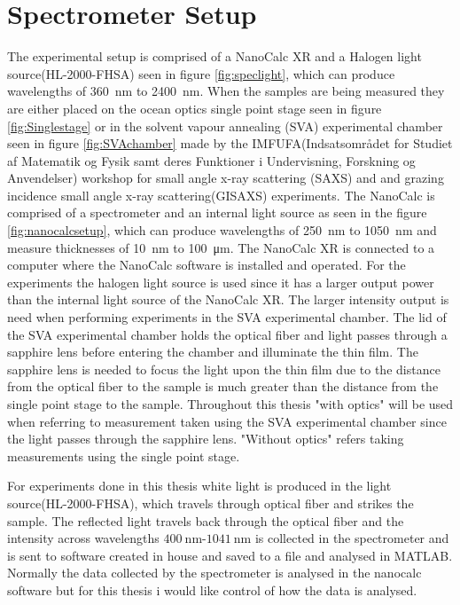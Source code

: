 \documentclass[MasterThesisMain.tex]{subfiles}
\begin{document}
\section{Spectrometer Setup}
The experimental setup is comprised of a NanoCalc XR and a Halogen light source(HL-2000-FHSA) seen in figure \ref{fig:speclight}, which can produce wavelengths of \SI{360}{\nano\meter} to \SI{2400}{\nano\meter}. When the samples are being measured they are either placed on the ocean optics single point stage seen in figure \ref{fig:Singlestage} or in the solvent vapour annealing (SVA) experimental chamber seen in figure \ref{fig:SVAchamber} made by the IMFUFA(Indsatsområdet for Studiet af Matematik og Fysik samt deres Funktioner i Undervisning, Forskning og Anvendelser) workshop for small angle x-ray scattering (SAXS) and and grazing incidence small angle x-ray scattering(GISAXS) experiments. The NanoCalc is comprised of a spectrometer and an internal light source as seen in the figure \ref{fig:nanocalcsetup}, which can produce wavelengths of \SI{250}{\nano\meter} to \SI{1050}{\nano\meter} and measure thicknesses of \SI{10}{\nano\meter} to \SI{100}{\micro\meter}. The NanoCalc XR is connected to a computer where the NanoCalc software is installed and operated. For the experiments the halogen light source is used since it has a larger output power than the internal light source of the NanoCalc XR. The larger intensity output is need when performing experiments in the SVA experimental chamber. The lid of the SVA experimental chamber holds the optical fiber and light passes through a sapphire lens before entering the chamber and illuminate the thin film. The sapphire lens is needed to focus the light upon the thin film due to the distance from the optical fiber to the sample is much greater than the distance from the single point stage to the sample. Throughout this thesis "with optics" will be used when referring to measurement taken using the SVA experimental chamber since the light passes through the sapphire lens. "Without optics" refers taking measurements using the single point stage.  

For experiments done in this thesis white light is produced in the light source(HL-2000-FHSA), which travels through optical fiber and strikes the sample. The reflected light travels back through the optical fiber and the intensity across wavelengths $\SI{400}{\nano\meter}$-$\SI{1041}{\nano\meter}$ is collected in the spectrometer and is sent to software created in house and saved to a file and analysed in MATLAB\textsuperscript{\textregistered}. Normally the data collected by the spectrometer is analysed in the nanocalc software but for this thesis i would like control of how the data is analysed.  
	
\end{document}
